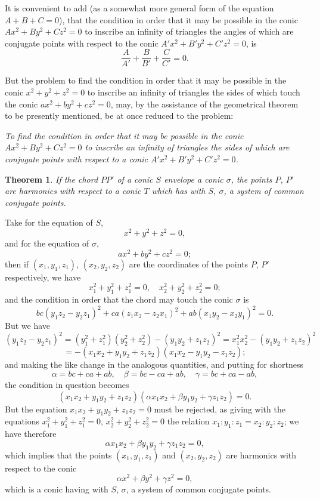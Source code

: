 \documentclass[11pt,a4paper]{book}
\newtheorem*{theorem}{Theorem}
\begin{document}
It is convenient to add (as a somewhat more general form of the equation $A+B+C=0$), that the condition in order that it may be possible in the conic $Ax^2 + By^2 + Cz^2 = 0$ to inscribe an infinity of triangles the angles of which are conjugate points with respect to the conic $A'x^2 + B'y^2 + C'z^2 = 0$, is
\[
\frac{A}{A'} + \frac{B}{B'} + \frac{C}{C'} = 0.
\]

But the problem to find the condition in order that it may be possible in the conic $x^2 + y^2 + z^2 = 0$ to inscribe an infinity of triangles the sides of which touch the conic $ax^2 + by^2 + cz^2 = 0$, may, by the assistance of the geometrical theorem to be presently mentioned, be at once reduced to the problem:

\textit{To find the condition in order that it may be possible in the conic $Ax^2 + By^2 + Cz^2 = 0$ to inscribe an infinity of triangles the sides of which are conjugate points with respect to a conic $A'x^2 + B'y^2 + C'z^2 = 0$.}

\begin{theorem}
If the chord $PP'$ of a conic $S$ envelope a conic $\sigma$, the points $P$, $P'$ are harmonics with respect to a conic $T$ which has with $S$, $\sigma$, a system of common conjugate points.
\end{theorem}

Take for the equation of $S$,
\[
x^2 + y^2 + z^2 = 0,
\]
and for the equation of $\sigma$,
\[
ax^2 + by^2 + cz^2 = 0;
\]
then if $(x_1, y_1, z_1)$, $(x_2, y_2, z_2)$ are the coordinates of the points $P$, $P'$ respectively, we have
\[
x_1^2 + y_1^2 + z_1^2 = 0, \quad x_2^2 + y_2^2 + z_2^2 = 0;
\]
and the condition in order that the chord may touch the conic $\sigma$ is
\[
bc(y_1z_2 - y_2z_1)^2 + ca(z_1x_2 - z_2x_1)^2 + ab(x_1y_2 - x_2y_1)^2 = 0.
\]
But we have
\[
(y_1z_2 - y_2z_1)^2 = (y_1^2 + z_1^2)(y_2^2 + z_2^2) - (y_1y_2 + z_1z_2)^2 = x_1^2x_2^2 - (y_1y_2 + z_1z_2)^2
\]
\[
= -(x_1x_2 + y_1y_2 + z_1z_2)(x_1x_2 - y_1y_2 - z_1z_2);
\]
and making the like change in the analogous quantities, and putting for shortness
\[
\alpha = bc + ca + ab, \quad \beta = bc - ca + ab, \quad \gamma = bc + ca - ab,
\]
the condition in question becomes
\[
(x_1x_2 + y_1y_2 + z_1z_2)(\alpha x_1x_2 + \beta y_1y_2 + \gamma z_1z_2) = 0.
\]
But the equation $x_1x_2 + y_1y_2 + z_1z_2 = 0$ must be rejected, as giving with the equations $x_1^2 + y_1^2 + z_1^2 = 0$, $x_2^2 + y_2^2 + z_2^2 = 0$ the relation $x_1:y_1:z_1 = x_2:y_2:z_2$; we have therefore
\[
\alpha x_1x_2 + \beta y_1y_2 + \gamma z_1z_2 = 0,
\]
which implies that the points $(x_1, y_1, z_1)$ and $(x_2, y_2, z_2)$ are harmonics with respect to the conic
\[
\alpha x^2 + \beta y^2 + \gamma z^2 = 0,
\]
which is a conic having with $S$, $\sigma$, a system of common conjugate points.
\end{document}
